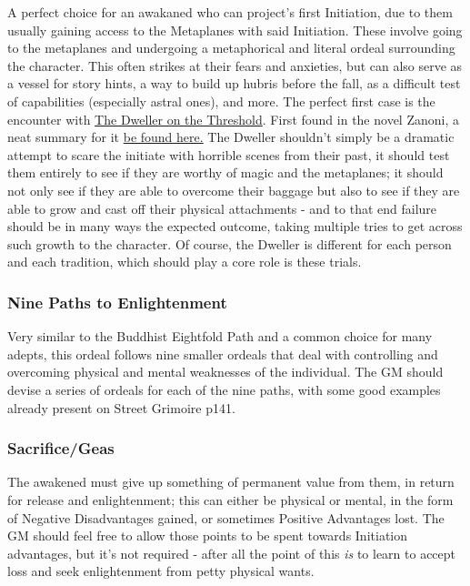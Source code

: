 \begin{multicols}{3}
	A perfect choice for an awakaned who can project's first Initiation, due to them usually gaining access to the Metaplanes with said Initiation. These involve going to the metaplanes and undergoing a metaphorical and literal ordeal surrounding the character. This often strikes at their fears and anxieties, but can also serve as a vessel for story hints, a way to build up hubris before the fall, as a difficult test of capabilities (especially astral ones), and more. The perfect first case is the encounter with \textcolor{Blue}{\href{https://en.wikipedia.org/wiki/Guardian_of_the_Threshold}{The Dweller on the Threshold}}. First found in the novel Zanoni, a neat summary for it \textcolor{Blue}{\href{https://web.archive.org/web/20160402204637/http://www.andras-nagy.com/dweller.html}{be found here.}} The Dweller shouldn't simply be a dramatic attempt to scare the initiate with horrible scenes from their past, it should test them entirely to see if they are worthy of magic and the metaplanes; it should not only see if they are able to overcome their baggage but also to see if they are able to grow and cast off their physical attachments - and to that end failure should be in many ways the expected outcome, taking multiple tries to get across such growth to the character. Of course, the Dweller is different for each person and each tradition, which should play a core role is these trials.
	
	\subsubsection*{Nine Paths to Enlightenment}
	
	Very similar to the Buddhist Eightfold Path and a common choice for many adepts, this ordeal follows nine smaller ordeals that deal with controlling and overcoming physical and mental weaknesses of the individual. The GM should devise a series of ordeals for each of the nine paths, with some good examples already present on Street Grimoire p141.
	
	\subsubsection*{Sacrifice/Geas}
	
	The awakened must give up something of permanent value from them, in return for release and enlightenment; this can either be physical or mental, in the form of Negative Disadvantages gained, or sometimes Positive Advantages lost. The GM should feel free to allow those points to be spent towards Initiation advantages, but it's not required - after all the point of this \textit{is} to learn to accept loss and seek enlightenment from petty physical wants.
	

\end{multicols}
